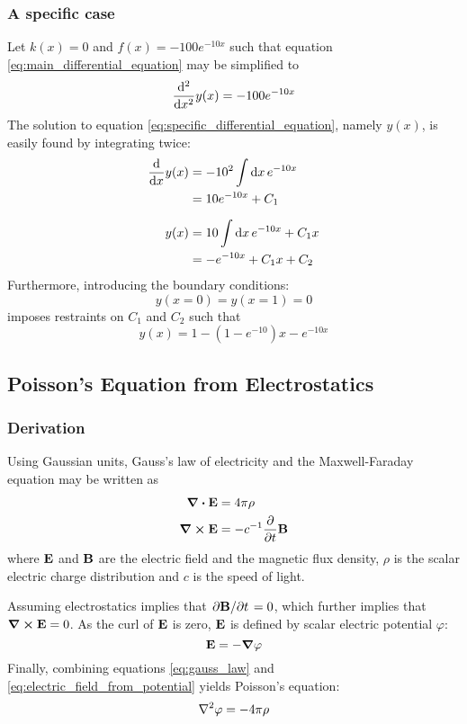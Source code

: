\documentclass[reprint,english]{revtex4-1}
\begin{document}
\subsubsection{A specific case}\label{sec:specific_case}
Let \(k(x)=0\) and \(f(x)=-100e^{-10x}\) such that equation \ref{eq:main_differential_equation} may be simplified to
\begin{equation}\label{eq:specific_differential_equation}
\dv[2]{x}y(x)=-100e^{-10x}
\end{equation}
The solution to equation \eqref{eq:specific_differential_equation}, namely \(y(x)\), is easily found by integrating twice:
\begin{align}
\dv{x}y(x)&=-10^2\int\dd{x}e^{-10x}\nonumber\\
&=10e^{-10x}+C_1\nonumber\\[2mm]
y(x)&=10\int\dd{x}e^{-10x}+C_1x\nonumber\\
&=-e^{-10x}+C_1x+C_2\label{eq:general_solution_to_specific}
\end{align}
Furthermore, introducing the boundary conditions:
\[y(x=0)=y(x=1)=0\]
imposes restraints on \(C_1\) and \(C_2\) such that
\begin{equation}\label{eq:specific_solution_to_specific}
y(x)=1-(1-e^{-10})x-e^{-10x}
\end{equation}
\subsection{Poisson's Equation from Electrostatics}\label{sec:poisson_equation}
\subsubsection{Derivation}
Using Gaussian units, Gauss's law of electricity and the Maxwell-Faraday equation may be written as
\begin{align}
\div\vb{E}&=4\pi\rho\label{eq:gauss_law}\\
\curl\vb{E}&=-c^{-1}\pdv{t}\vb{B}\label{eq:maxwell-farady_equation}
\end{align}
where \(\vb{E}\) and \(\vb{B}\) are the electric field and the magnetic flux density, \(\rho\) is the scalar electric charge distribution and \(c\) is the speed of light.

Assuming electrostatics implies that \(\pdv*{\vb{B}}{t}=0\), which further implies that \(\curl\vb{E}=0\). As the curl of \(\vb{E}\) is zero, \(\vb{E}\) is defined by scalar electric potential \(\varphi\):
\begin{equation}\label{eq:electric_field_from_potential}
\vb{E}=-\grad\varphi
\end{equation}
Finally, combining equations \eqref{eq:gauss_law} and \eqref{eq:electric_field_from_potential} yields Poisson's equation:
\begin{equation}\label{eq:poisson_equation_electrostatics}
\laplacian\varphi=-4\pi\rho
\end{equation}
\newpage
\end{document}
